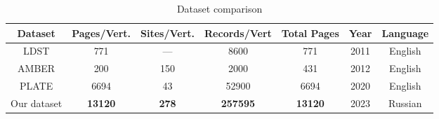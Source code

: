\begin{table*}[!ht]
\caption{Dataset comparison}
\begin{center}
    \begin{tabular}{ccccccc}
        \toprule
        Dataset & Pages/Vert. & Sites/Vert. & Records/Vert & Total Pages & Year & Language\\
        \midrule
        LDST & 771 & --- & 8600 & 771 & 2011 & English\\
        AMBER & 200 & 150 & 2000 & 431 & 2012 & English\\
        PLATE & 6694 & 43 & 52900 & 6694 & 2020 & English\\
        \midrule
        Our dataset & \textbf{13120} & \textbf{278} & \textbf{257595} & \textbf{13120} & 2023 & Russian\\
        \bottomrule
    \end{tabular}
    \label{tab:dataset_compare}
\end{center}
\end{table*}